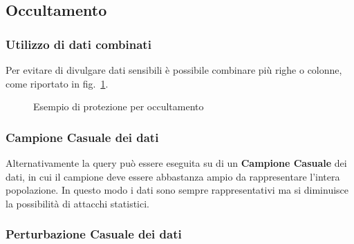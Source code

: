 \subsection{Occultamento}

\subsubsection{Utilizzo di dati combinati}
Per evitare di divulgare dati sensibili è possibile combinare più righe o colonne, come riportato in fig.~\ref{fig:query_occultamento}.

\begin{figure}[htpb]
	\centering
		
				
		\caption{Esempio di protezione per occultamento
		  \label{fig:query_occultamento}}  

\end{figure}

\subsubsection{Campione Casuale dei dati}

Alternativamente la query può essere eseguita su di un \textbf{Campione Casuale} dei dati, in cui il campione deve essere abbastanza ampio da rappresentare l'intera popolazione. In questo modo i dati sono sempre rappresentativi ma si diminuisce la possibilità di attacchi statistici.

\subsubsection{Perturbazione Casuale dei dati}

